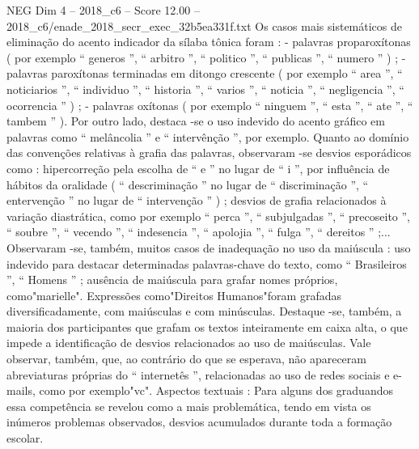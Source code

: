 \begin{textsample}{NEG Dim 4 – 2018\_c6 – Score 12.00 – 2018\_c6/enade\_2018\_secr\_exec\_32b5ea331f.txt}
Os casos mais sistemáticos de eliminação do acento indicador da sílaba tônica foram : - palavras proparoxítonas ( por exemplo “ generos ”, “ arbitro ”, “ politico ”, “ publicas ”, “ numero ” ) ; - palavras paroxítonas terminadas em ditongo crescente ( por exemplo “ area ”, “ noticiarios ”, “ individuo ”, “ historia ”, “ varios ”, “ noticia ”, “ negligencia ”, “ ocorrencia ” ) ; - palavras oxítonas ( por exemplo “ ninguem ”, “ esta ”, “ ate ”, “ tambem ” ).
Por outro lado, destaca -se o uso indevido do acento gráfico em palavras como “ melâncolia ” e “ intervênção ”, por exemplo.
Quanto ao domínio das convenções relativas à grafia das palavras, observaram -se desvios esporádicos como : hipercorreção pela escolha de “ e ” no lugar de “ i ”, por influência de hábitos da oralidade ( “ descriminação ” no lugar de “ discriminação ”, “ entervenção ” no lugar de “ intervenção ” ) ; desvios de grafia relacionados à variação diastrática, como por exemplo “ perca ”, “ subjulgadas ”, “ precoseito ”, “ soubre ”, “ vecendo ”, “ indesencia ”, “ apolojia ”, “ fulga ”, “ dereitos ” ;...
Observaram -se, também, muitos casos de inadequação no uso da maiúscula : uso indevido para destacar determinadas palavras-chave do texto, como “ Brasileiros ”, “ Homens ” ; ausência de maiúscula para grafar nomes próprios, como"marielle".
Expressões como"Direitos Humanos"foram grafadas diversificadamente, com maiúsculas e com minúsculas.
Destaque -se, também, a maioria dos participantes que grafam os textos inteiramente em caixa alta, o que impede a identificação de desvios relacionados ao uso de maiúsculas.
Vale observar, também, que, ao contrário do que se esperava, não apareceram abreviaturas próprias do “ internetês ”, relacionadas ao uso de redes sociais e e-mails, como por exemplo"vc".
Aspectos textuais : Para alguns dos graduandos essa competência se revelou como a mais problemática, tendo em vista os inúmeros problemas observados, desvios acumulados durante toda a formação escolar.

\end{textsample}
